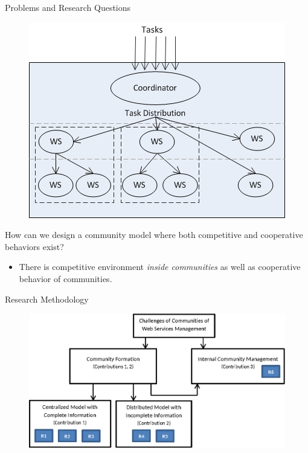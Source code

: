 \documentclass{beamer}
\begin{document}
\begin{frame}{Problems and Research Questions}
    \begin{figure}[h]
        \centering
         \includegraphics[scale=0.5]{figures/rq3.png}
        \label{architectureFigure}
    \end{figure}

    \footnotesize{\colorbox{blue}{\color{white}{R6}} How can we design a community model where both competitive and cooperative behaviors exist?}\\
        \begin{itemize}
            \item There is competitive environment \emph{inside communities} as well as cooperative behavior of communities.
        \end{itemize}

\end{frame}

\begin{frame}{Research Methodology}
    \begin{figure}[htbp]
        \centering
        \includegraphics[width=0.9 \columnwidth]{figures/model.eps}
    \end{figure}
\end{frame}
\end{document}
